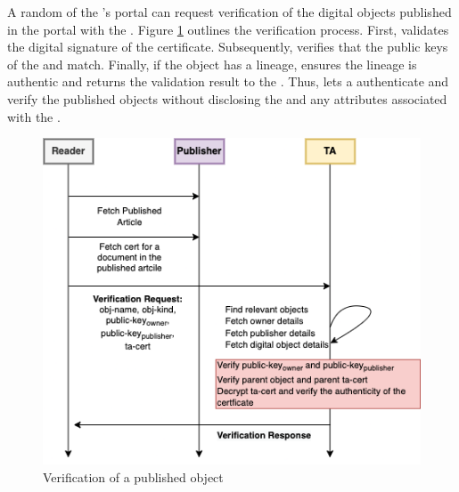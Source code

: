 A random \reader of the \publisher's portal can request verification of the digital objects published in the portal with the \ta. Figure \ref{fig:verification} outlines the verification process. First, \ta validates the digital signature of the certificate. Subsequently, \ta verifies that the public keys of the \owner and \publisher match. Finally, if the object has a lineage, \ta ensures the lineage is authentic and returns the validation result to the \reader. Thus, \name lets a \reader authenticate and verify the published objects without disclosing the \owner and any attributes associated with the \owner. 

\begin{figure}[htpb]
  \centering
  \includegraphics[scale=0.45]{verification.png}
  \caption{Verification of a published object}
  \label{fig:verification}
\end{figure}